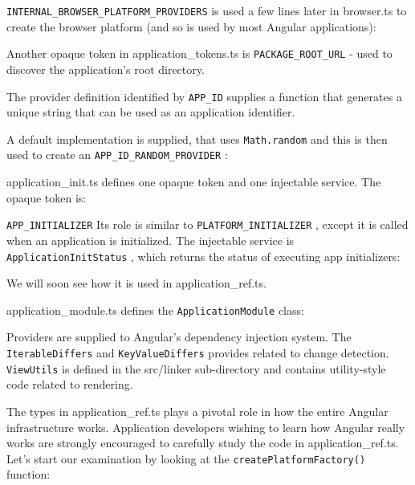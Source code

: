 

\texttt{INTERNAL\_BROWSER\_PLATFORM\_PROVIDERS}
is used a few lines later in browser.ts to
create the browser platform (and so is used by most Angular applications):



Another opaque token in application\_tokens.ts is
\texttt{PACKAGE\_ROOT\_URL}
- used to
discover the application’s root directory.

The provider definition identified by
\texttt{APP\_ID}
supplies a function that generates a
unique string that can be used as an application identifier.



A default implementation is supplied, that uses
\texttt{Math.random}
and this is then used to
create an
\texttt{APP\_ID\_RANDOM\_PROVIDER}
:



application\_init.ts defines one opaque token and one injectable service. The opaque
token is:



\texttt{APP\_INITIALIZER}
Its role is similar to
\texttt{PLATFORM\_INITIALIZER}
, except it is called
when an application is initialized. The injectable service is
\texttt{ApplicationInitStatus}
,
which returns the status of executing app initializers:



We will soon see how it is used in application\_ref.ts.

application\_module.ts defines the
\texttt{ApplicationModule}
class:



Providers are supplied to Angular’s dependency injection system. The
\texttt{IterableDiffers}
and
\texttt{KeyValueDiffers}
provides related to change detection.
\texttt{ViewUtils}
is defined in the src/linker sub-directory and contains utility-style code
related to rendering.

The types in application\_ref.ts plays a pivotal role in how the entire Angular
infrastructure works. Application developers wishing to learn how Angular really works
are strongly encouraged to carefully study the code in application\_ref.ts. Let’s start
our examination by looking at the
\texttt{createPlatformFactory()}
function:


